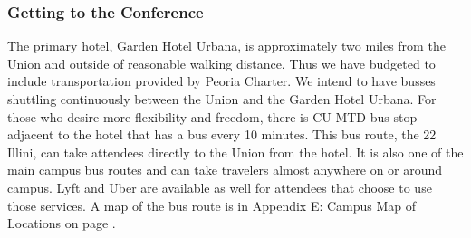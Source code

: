 \subsubsection{Getting to the Conference}
The primary hotel, Garden Hotel Urbana, is approximately two miles from the Union and outside of reasonable walking distance. Thus we have budgeted to include transportation provided by Peoria Charter. We intend to have busses shuttling continuously between the Union and the Garden Hotel Urbana. For those who desire more flexibility and freedom, there is CU-MTD bus stop adjacent to the hotel that has a bus every 10 minutes. This bus route, the 22 Illini, can take attendees directly to the Union from the hotel. It is also one of the main campus bus routes and can take travelers almost anywhere on or around campus. Lyft and Uber are available as well for attendees that choose to use those services. A map of the bus route is in Appendix E: Campus Map of Locations on page \pageref{appendix:map}.

